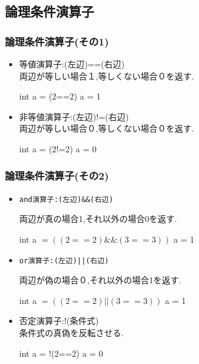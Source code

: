 \documentclass[dvipdfmx]{beamer}
\begin{document}
\subsection{論理条件演算子}
\begin{frame}[c, fragile, label=19]
    \frametitle{論理条件演算子(その1)}
    \begin{itemize}
        \item 等値演算子:(左辺)==(右辺)\\
            \qquad 両辺が等しい場合１,等しくない場合０を返す.
            \begin{block}{int a = (2==2)}
                a = 1
            \end{block}
        \item 非等値演算子:(左辺)!=(右辺)\\
            \qquad 両辺が等しい場合０,等しくない場合０を返す.
            \begin{block}{int a = (2!=2)}
                a = 0
            \end{block}
    \end{itemize}
    \vfill \hfill 
    \hyperlink{18}{}
    \space
    \hyperlink{20}{}
\end{frame}

\begin{frame}[c, fragile, label=20]
    \frametitle{論理条件演算子(その2)}
    \begin{itemize}
        \item \begin{verbatim}and演算子:(左辺)&&(右辺)\end{verbatim}
            \qquad 両辺が真の場合1,それ以外の場合0を返す.
            \begin{block}{int a $= ((2==2)\&\& (3==3))$}
                a = 1
            \end{block}
        \item \begin{verbatim}or演算子:(左辺)||(右辺)\end{verbatim}
            \qquad 両辺が偽の場合０,それ以外の場合1を返す.
            \begin{block}{int a $= ((2==2) \lvert\rvert  (3==3))$}
                a = 1
            \end{block}
        \item 否定演算子:!(条件式)\\
            \qquad 条件式の真偽を反転させる.
            \begin{block}{int a = !(2==2)}
                    a = 0
            \end{block}
    \end{itemize}
    \vfill \hfill 
    \hyperlink{19}{}
    \space
    \hyperlink{21}{}
\end{frame}
\end{document}
